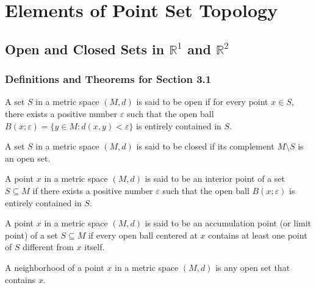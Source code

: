 \chapter{Elements of Point Set Topology}

\section{Open and Closed Sets in $\mathbb{R}^1$ and $\mathbb{R}^2$}

\subsection*{Definitions and Theorems for Section 3.1}

\begin{definition}
A set $S$ in a metric space $(M,d)$ is said to be open if for every point $x \in S$, there exists a positive number $\varepsilon$ such that the open ball $B(x;\varepsilon) = \{y \in M : d(x,y) < \varepsilon\}$ is entirely contained in $S$.
\end{definition}

\begin{definition}
A set $S$ in a metric space $(M,d)$ is said to be closed if its complement $M \setminus S$ is an open set.
\end{definition}

\begin{definition}
A point $x$ in a metric space $(M,d)$ is said to be an interior point of a set $S \subseteq M$ if there exists a positive number $\varepsilon$ such that the open ball $B(x;\varepsilon)$ is entirely contained in $S$.
\end{definition}

\begin{definition}
A point $x$ in a metric space $(M,d)$ is said to be an accumulation point (or limit point) of a set $S \subseteq M$ if every open ball centered at $x$ contains at least one point of $S$ different from $x$ itself.
\end{definition}

\begin{definition}[Neighborhood]
A neighborhood of a point $x$ in a metric space $(M,d)$ is any open set that contains $x$.
\end{definition}

